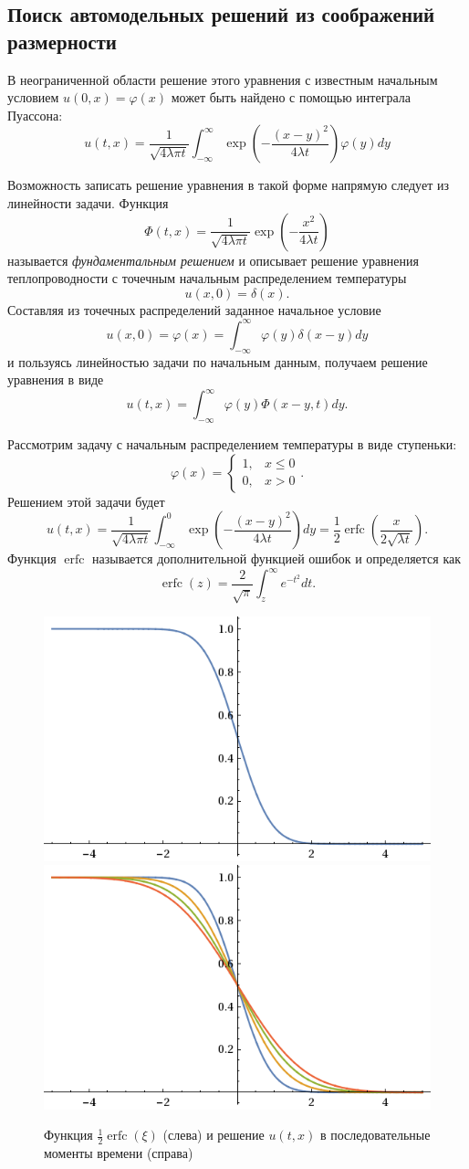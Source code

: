 \documentclass[12pt]{article}
\renewcommand{\leq}{\leqslant}
\begin{document}
\subsection{Поиск автомодельных решений из соображений размерности}

В неограниченной области решение этого уравнения с известным начальным условием $u(0, x) = \varphi(x)$ может быть найдено с помощью интеграла Пуассона:
\[
u(t, x) = \frac{1}{\sqrt{4 \lambda \pi t}}\int_{-\infty}^{\infty}  \exp\left(
-\frac{(x-y)^2}{4 \lambda t}
\right) \varphi(y) dy
\]

Возможность записать решение уравнения в такой форме напрямую следует из линейности задачи. Функция
\[
\Phi(t, x) = \frac{1}{\sqrt{4\lambda\pi t}} \exp\left(-\frac{x^2}{4\lambda t}\right)
\]
называется \emph{фундаментальным решением} и описывает решение уравнения теплопроводности с точечным начальным распределением температуры
\[
u(x, 0) = \delta(x).
\]
Составляя из точечных распределений заданное начальное условие
\[
u(x, 0) = \varphi(x) = \int_{-\infty}^{\infty} \varphi(y) \delta(x - y) dy
\]
и пользуясь линейностью задачи по начальным данным, получаем решение уравнения в виде
\[
u(t, x) = \int_{-\infty}^{\infty} \varphi(y) \Phi(x-y, t) dy.
\]

Рассмотрим задачу с начальным распределением температуры в виде ступеньки:
\[
\varphi(x) = \begin{cases}
1, &x \leq 0\\
0, &x > 0
\end{cases}.
\]
Решением этой задачи будет
\[
u(t, x) = \frac{1}{\sqrt{4 \lambda \pi t}}\int_{-\infty}^{0}  \exp\left(
-\frac{(x-y)^2}{4 \lambda t}
\right) dy = \frac{1}{2} \operatorname{erfc}\left(\frac{x}{2\sqrt{\lambda t}}\right).
\]
Функция $\operatorname{erfc}$ называется дополнительной функцией ошибок и определяется как
\[
\operatorname{erfc}(z) = \frac{2}{\sqrt{\pi}} \int_{z}^\infty e^{-t^2} dt.
\]
\begin{figure}[ht!]
\centering
\includegraphics[width=.45\textwidth]{erfc.png}
\includegraphics[width=.45\textwidth]{attimes.png}
\caption{Функция $\frac{1}{2}\operatorname{erfc}(\xi)$ (слева) и решение $u(t,x)$ в последовательные моменты времени (справа)}
\end{figure}
\end{document}
